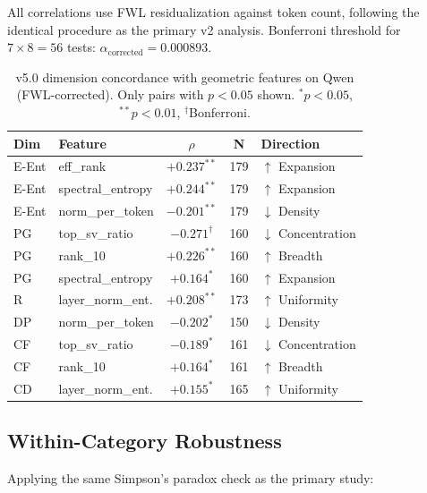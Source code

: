 \documentclass[11pt,a4paper]{article}
\begin{document}
All correlations use FWL residualization against token count, following the identical procedure as the primary v2 analysis. Bonferroni threshold for $7 \times 8 = 56$ tests: $\alpha_{\text{corrected}} = 0.000893$.

\begin{table}[H]
\centering
\caption{v5.0 dimension concordance with geometric features on Qwen (FWL-corrected). Only pairs with $p < 0.05$ shown. $^*p < 0.05$, $^{**}p < 0.01$, $^{\dagger}$Bonferroni.}
\label{tab:v5concordance}
\begin{tabular}{llccl}
\toprule
\textbf{Dim} & \textbf{Feature} & \textbf{$\rho$} & \textbf{N} & \textbf{Direction} \\
\midrule
E-Ent & eff\_rank         & $+0.237^{**}$  & 179 & $\uparrow$ Expansion \\
E-Ent & spectral\_entropy & $+0.244^{**}$  & 179 & $\uparrow$ Expansion \\
E-Ent & norm\_per\_token  & $-0.201^{**}$  & 179 & $\downarrow$ Density \\
\midrule
PG    & top\_sv\_ratio    & $-0.271^{\dagger}$ & 160 & $\downarrow$ Concentration \\
PG    & rank\_10          & $+0.226^{**}$  & 160 & $\uparrow$ Breadth \\
PG    & spectral\_entropy & $+0.164^*$     & 160 & $\uparrow$ Expansion \\
\midrule
R     & layer\_norm\_ent. & $+0.208^{**}$  & 173 & $\uparrow$ Uniformity \\
\midrule
DP    & norm\_per\_token  & $-0.202^*$     & 150 & $\downarrow$ Density \\
\midrule
CF    & top\_sv\_ratio    & $-0.189^*$     & 161 & $\downarrow$ Concentration \\
CF    & rank\_10          & $+0.164^*$     & 161 & $\uparrow$ Breadth \\
\midrule
CD    & layer\_norm\_ent. & $+0.155^*$     & 165 & $\uparrow$ Uniformity \\
\bottomrule
\end{tabular}
\end{table}

\subsection{Within-Category Robustness}

Applying the same Simpson's paradox check as the primary study:
\end{document}
